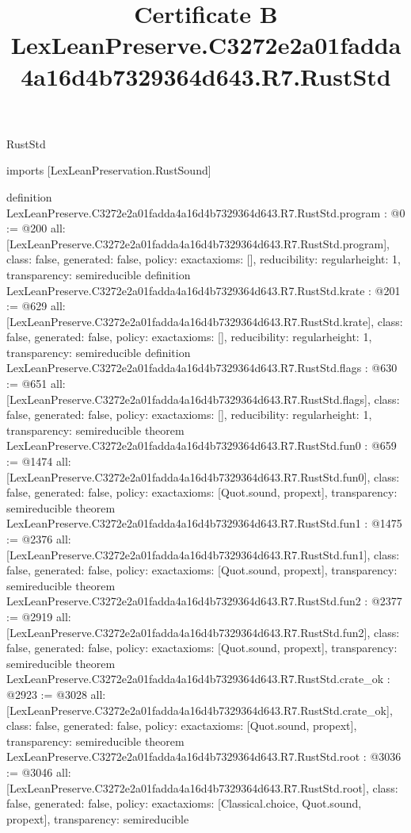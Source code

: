 \begin{lexlean}{RustStd}
\title{Certificate B LexLeanPreserve.C3272e2a01fadda4a16d4b7329364d643.R7.RustStd}
\begin{coremodule}
imports [LexLeanPreservation.RustSound]

definition LexLeanPreserve.C3272e2a01fadda4a16d4b7329364d643.R7.RustStd.program : @0 := @200 {
  all: [LexLeanPreserve.C3272e2a01fadda4a16d4b7329364d643.R7.RustStd.program],
  class: false,
  generated: false,
  policy: exact{axioms: []},
  reducibility: regular{height: 1},
  transparency: semireducible
}
definition LexLeanPreserve.C3272e2a01fadda4a16d4b7329364d643.R7.RustStd.krate : @201 := @629 {
  all: [LexLeanPreserve.C3272e2a01fadda4a16d4b7329364d643.R7.RustStd.krate],
  class: false,
  generated: false,
  policy: exact{axioms: []},
  reducibility: regular{height: 1},
  transparency: semireducible
}
definition LexLeanPreserve.C3272e2a01fadda4a16d4b7329364d643.R7.RustStd.flags : @630 := @651 {
  all: [LexLeanPreserve.C3272e2a01fadda4a16d4b7329364d643.R7.RustStd.flags],
  class: false,
  generated: false,
  policy: exact{axioms: []},
  reducibility: regular{height: 1},
  transparency: semireducible
}
theorem LexLeanPreserve.C3272e2a01fadda4a16d4b7329364d643.R7.RustStd.fun0 : @659 := @1474 {
  all: [LexLeanPreserve.C3272e2a01fadda4a16d4b7329364d643.R7.RustStd.fun0],
  class: false,
  generated: false,
  policy: exact{axioms: [Quot.sound, propext]},
  transparency: semireducible
}
theorem LexLeanPreserve.C3272e2a01fadda4a16d4b7329364d643.R7.RustStd.fun1 : @1475 := @2376 {
  all: [LexLeanPreserve.C3272e2a01fadda4a16d4b7329364d643.R7.RustStd.fun1],
  class: false,
  generated: false,
  policy: exact{axioms: [Quot.sound, propext]},
  transparency: semireducible
}
theorem LexLeanPreserve.C3272e2a01fadda4a16d4b7329364d643.R7.RustStd.fun2 : @2377 := @2919 {
  all: [LexLeanPreserve.C3272e2a01fadda4a16d4b7329364d643.R7.RustStd.fun2],
  class: false,
  generated: false,
  policy: exact{axioms: [Quot.sound, propext]},
  transparency: semireducible
}
theorem LexLeanPreserve.C3272e2a01fadda4a16d4b7329364d643.R7.RustStd.crate_ok : @2923 := @3028 {
  all: [LexLeanPreserve.C3272e2a01fadda4a16d4b7329364d643.R7.RustStd.crate_ok],
  class: false,
  generated: false,
  policy: exact{axioms: [Quot.sound, propext]},
  transparency: semireducible
}
theorem LexLeanPreserve.C3272e2a01fadda4a16d4b7329364d643.R7.RustStd.root : @3036 := @3046 {
  all: [LexLeanPreserve.C3272e2a01fadda4a16d4b7329364d643.R7.RustStd.root],
  class: false,
  generated: false,
  policy: exact{axioms: [Classical.choice, Quot.sound, propext]},
  transparency: semireducible
}


\end{coremodule}
\end{lexlean}

